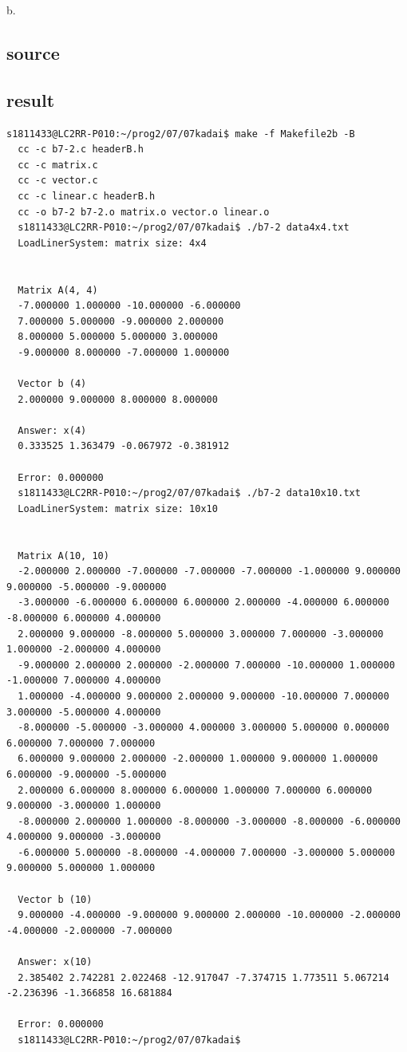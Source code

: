 \documentclass[10pt,a4paper]{jsarticle}
\begin{document}
b.
\subsection{source}




\subsection{result}
\begin{lstlisting}[basicstyle=\ttfamily\footnotesize,frame=single,breaklines=tr\
    \
    ue]
  s1811433@LC2RR-P010:~/prog2/07/07kadai$ make -f Makefile2b -B
  cc -c b7-2.c headerB.h
  cc -c matrix.c
  cc -c vector.c
  cc -c linear.c headerB.h
  cc -o b7-2 b7-2.o matrix.o vector.o linear.o
  s1811433@LC2RR-P010:~/prog2/07/07kadai$ ./b7-2 data4x4.txt
  LoadLinerSystem: matrix size: 4x4


  Matrix A(4, 4)
  -7.000000 1.000000 -10.000000 -6.000000
  7.000000 5.000000 -9.000000 2.000000
  8.000000 5.000000 5.000000 3.000000
  -9.000000 8.000000 -7.000000 1.000000

  Vector b (4)
  2.000000 9.000000 8.000000 8.000000

  Answer: x(4)
  0.333525 1.363479 -0.067972 -0.381912

  Error: 0.000000
  s1811433@LC2RR-P010:~/prog2/07/07kadai$ ./b7-2 data10x10.txt
  LoadLinerSystem: matrix size: 10x10


  Matrix A(10, 10)
  -2.000000 2.000000 -7.000000 -7.000000 -7.000000 -1.000000 9.000000 9.000000 -5.000000 -9.000000
  -3.000000 -6.000000 6.000000 6.000000 2.000000 -4.000000 6.000000 -8.000000 6.000000 4.000000
  2.000000 9.000000 -8.000000 5.000000 3.000000 7.000000 -3.000000 1.000000 -2.000000 4.000000
  -9.000000 2.000000 2.000000 -2.000000 7.000000 -10.000000 1.000000 -1.000000 7.000000 4.000000
  1.000000 -4.000000 9.000000 2.000000 9.000000 -10.000000 7.000000 3.000000 -5.000000 4.000000
  -8.000000 -5.000000 -3.000000 4.000000 3.000000 5.000000 0.000000 6.000000 7.000000 7.000000
  6.000000 9.000000 2.000000 -2.000000 1.000000 9.000000 1.000000 6.000000 -9.000000 -5.000000
  2.000000 6.000000 8.000000 6.000000 1.000000 7.000000 6.000000 9.000000 -3.000000 1.000000
  -8.000000 2.000000 1.000000 -8.000000 -3.000000 -8.000000 -6.000000 4.000000 9.000000 -3.000000
  -6.000000 5.000000 -8.000000 -4.000000 7.000000 -3.000000 5.000000 9.000000 5.000000 1.000000

  Vector b (10)
  9.000000 -4.000000 -9.000000 9.000000 2.000000 -10.000000 -2.000000 -4.000000 -2.000000 -7.000000

  Answer: x(10)
  2.385402 2.742281 2.022468 -12.917047 -7.374715 1.773511 5.067214 -2.236396 -1.366858 16.681884

  Error: 0.000000
  s1811433@LC2RR-P010:~/prog2/07/07kadai$
  
\end{lstlisting}
\end{document}
